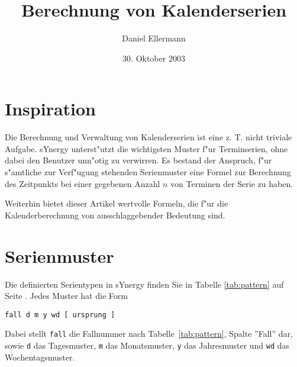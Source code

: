 \documentclass[a4paper]{article}
\title{Berechnung von Kalenderserien}
\author{Daniel Ellermann}
\date{30. Oktober 2003}
\numberwithin{equation}{section}
\begin{document}
\maketitle
\tableofcontents



%
%
%
%
\section{Inspiration}
Die Berechnung und Verwaltung von Kalenderserien ist eine z. T. nicht triviale
Aufgabe. sYnergy unterst"utzt die wichtigsten Muster f"ur Terminserien, ohne
dabei den Benutzer unn"otig zu verwirren. Es bestand der Anspruch, f"ur
s"amtliche zur Verf"ugung stehenden Serienmuster eine Formel zur Berechnung
des Zeitpunkts bei einer gegebenen Anzahl $n$ von Terminen der Serie zu haben.

Weiterhin bietet dieser Artikel wertvolle Formeln, die f"ur die
Kalenderberechnung von ausschlaggebender Bedeutung sind.



%
%
%
%
\section{Serienmuster}
Die definierten Serientypen in sYnergy finden Sie in Tabelle \ref{tab:pattern}
auf Seite \pageref{tab:pattern}. Jedes Muster hat die Form

\vspace{8pt}
\texttt{fall d m y wd [ ursprung ]}
\vspace{8pt}

\noindent Dabei stellt \texttt{fall} die Fallnummer nach
Tabelle~\ref{tab:pattern}, Spalte ''Fall'' dar, sowie \texttt{d} das
Tagesmuster, \texttt{m} das Monatsmuster, \texttt{y} das Jahresmuster und
\texttt{wd} das Wochentagsmuster.
\end{document}
